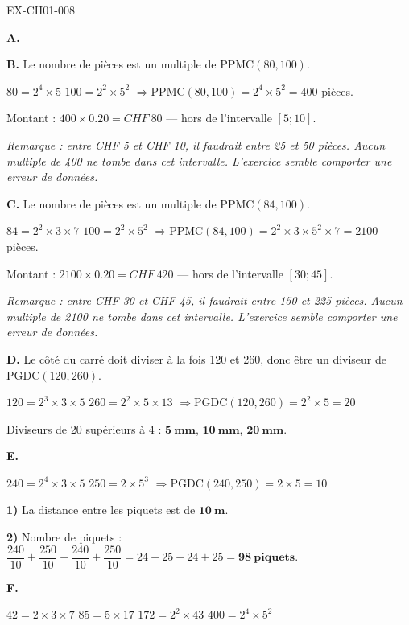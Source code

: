\begin{solution}{EX-CH01-008}

\textbf{A.} 

\bigskip
\textbf{B.} Le nombre de pièces est un multiple de $\text{PPMC}(80, 100)$.

$80 = 2^4 \times 5$ \quad $100 = 2^2 \times 5^2$ \quad $\Rightarrow \text{PPMC}(80,100) = 2^4 \times 5^2 = 400$ pièces.

Montant : $400 \times 0.20 = CHF\ 80$ — hors de l'intervalle $[5; 10]$.

\medskip
\textit{Remarque : entre CHF 5 et CHF 10, il faudrait entre 25 et 50 pièces. Aucun multiple de 400 ne tombe dans cet intervalle. L'exercice semble comporter une erreur de données.}

\bigskip
\textbf{C.} Le nombre de pièces est un multiple de $\text{PPMC}(84, 100)$.

$84 = 2^2 \times 3 \times 7$ \quad $100 = 2^2 \times 5^2$ \quad $\Rightarrow \text{PPMC}(84,100) = 2^2 \times 3 \times 5^2 \times 7 = 2100$ pièces.

Montant : $2100 \times 0.20 = CHF\ 420$ — hors de l'intervalle $[30; 45]$.

\medskip
\textit{Remarque : entre CHF 30 et CHF 45, il faudrait entre 150 et 225 pièces. Aucun multiple de 2100 ne tombe dans cet intervalle. L'exercice semble comporter une erreur de données.}

\bigskip
\textbf{D.} Le côté du carré doit diviser à la fois 120 et 260, donc être un diviseur de $\text{PGDC}(120, 260)$.

$120 = 2^3 \times 3 \times 5$ \quad $260 = 2^2 \times 5 \times 13$ \quad $\Rightarrow \text{PGDC}(120,260) = 2^2 \times 5 = 20$

Diviseurs de 20 supérieurs à 4 : $\mathbf{5\ mm}$, $\mathbf{10\ mm}$, $\mathbf{20\ mm}$.

\bigskip
\textbf{E.}

$240 = 2^4 \times 3 \times 5$ \quad $250 = 2 \times 5^3$ \quad $\Rightarrow \text{PGDC}(240,250) = 2 \times 5 = 10$

\textbf{1)} La distance entre les piquets est de $\mathbf{10\ m}$.

\textbf{2)} Nombre de piquets : $\dfrac{240}{10} + \dfrac{250}{10} + \dfrac{240}{10} + \dfrac{250}{10} = 24 + 25 + 24 + 25 = \mathbf{98\ piquets}$.

\bigskip
\textbf{F.}

$42 = 2 \times 3 \times 7$ \quad $85 = 5 \times 17$ \quad $172 = 2^2 \times 43$ \quad $400 = 2^4 \times 5^2$


\end{solution}
